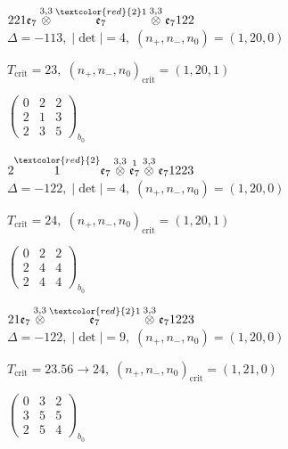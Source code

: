 \documentclass[10pt]{article}
\begin{document}
\smallskip

$221\mathfrak{e}_7\overset{3,3}{\otimes}\overset{\textcolor{red}{2}1}{\mathfrak{e}_7}\overset{3,3}{\otimes}\mathfrak{e}_7122$ \quad $\Delta=-113,\; |\det|=4,\; (n_+,n_-,n_0)=(1,20,0)$

\hspace{1em}$T_{\text{crit}}=23,\; (n_+,n_-,n_0)_{\text{crit}}=(1,20,1)$

\hspace{2em}$\left(\begin{smallmatrix}0 & 2 & 2 \\ 2 & 1 & 3 \\ 2 & 3 & 5\end{smallmatrix}\right)_{\!b_0}$

\smallskip

$2\overset{\textcolor{red}{2}}{1}\mathfrak{e}_7\overset{3,3}{\otimes}\overset{1}{\mathfrak{e}_7}\overset{3,3}{\otimes}\mathfrak{e}_71223$ \quad $\Delta=-122,\; |\det|=4,\; (n_+,n_-,n_0)=(1,20,0)$

\hspace{1em}$T_{\text{crit}}=24,\; (n_+,n_-,n_0)_{\text{crit}}=(1,20,1)$

\hspace{2em}$\left(\begin{smallmatrix}0 & 2 & 2 \\ 2 & 4 & 4 \\ 2 & 4 & 4\end{smallmatrix}\right)_{\!b_0}$

$21\mathfrak{e}_7\overset{3,3}{\otimes}\overset{\textcolor{red}{2}1}{\mathfrak{e}_7}\overset{3,3}{\otimes}\mathfrak{e}_71223$ \quad $\Delta=-122,\; |\det|=9,\; (n_+,n_-,n_0)=(1,20,0)$

\hspace{1em}$T_{\text{crit}}=23.56 \to 24,\; (n_+,n_-,n_0)_{\text{crit}}=(1,21,0)$

\hspace{2em}$\left(\begin{smallmatrix}0 & 3 & 2 \\ 3 & 5 & 5 \\ 2 & 5 & 4\end{smallmatrix}\right)_{\!b_0}$

\smallskip
\end{document}
